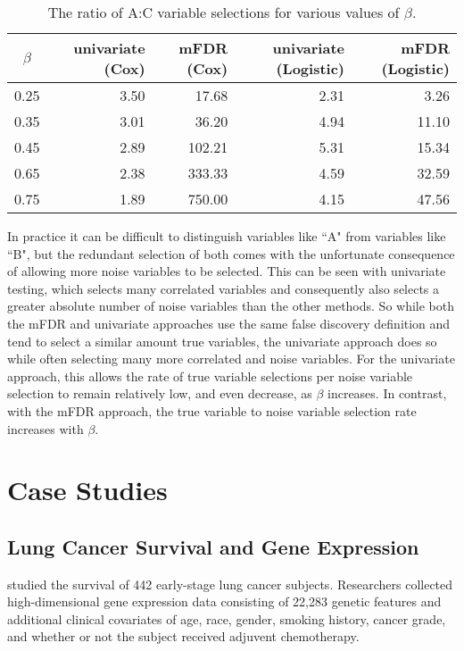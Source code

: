 \begin{table}[ht]
\centering
\begin{tabular}{c | r r r r}
  \hline
 $\beta$ & univariate (Cox) & mFDR (Cox) & univariate (Logistic) & mFDR (Logistic) \\ 
  \hline
  0.25 & 3.50 & 17.68 & 2.31 & 3.26 \\ 
  0.35 & 3.01 & 36.20 & 4.94 & 11.10 \\ 
  0.45 & 2.89 & 102.21 & 5.31 & 15.34 \\ 
  0.65 & 2.38 & 333.33 & 4.59 & 32.59 \\ 
  0.75 & 1.89 & 750.00 & 4.15 & 47.56 \\ 
   \hline
\end{tabular}
\caption{The ratio of A:C variable selections for various values of $\beta$.}
\end{table}

In practice it can be difficult to distinguish variables like ``A" from variables like ``B", but the redundant selection of both comes with the unfortunate consequence of allowing more noise variables to be selected. This can be seen with univariate testing, which selects many correlated variables and consequently also selects a greater absolute number of noise variables than the other methods. So while both the mFDR and univariate approaches use the same false discovery definition and tend to select a similar amount true variables, the univariate approach does so while often selecting many more correlated and noise variables. For the univariate approach, this allows the rate of true variable selections per noise variable selection to remain relatively low, and even decrease, as $\beta$ increases. In contrast, with the mFDR approach, the true variable to noise variable selection rate increases with $\beta$.  

\section{Case Studies}

\subsection{Lung Cancer Survival and Gene Expression}
\citet{Shedden2008} studied the survival of 442 early-stage lung cancer subjects. Researchers collected high-dimensional gene expression data consisting of 22,283 genetic features and additional clinical covariates of age, race, gender, smoking history, cancer grade, and whether or not the subject received adjuvent chemotherapy.  

